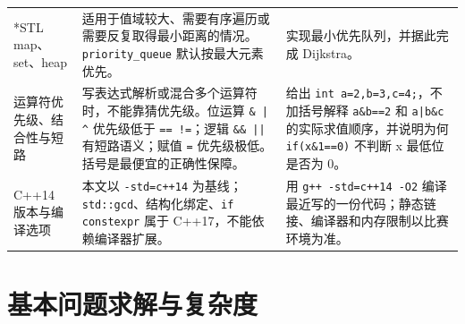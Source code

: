 \documentclass[a4paper,11pt]{article}
\newcommand{\code}[1]{\texttt{#1}}
\begin{document}
\begin{longtable}{L{2.4cm} L{7.5cm} L{6.8cm}}
*STL map、set、heap
& 适用于值域较大、需要有序遍历或需要反复取得最小距离的情况。\code{priority\_queue} 默认按最大元素优先。
& 实现最小优先队列，并据此完成 Dijkstra。 \\[2mm]

运算符优先级、结合性与短路
& 写表达式解析或混合多个运算符时，不能靠猜优先级。位运算 \code{\& | \^{}} 优先级低于 \code{== !=}；逻辑 \code{\&\& ||} 有短路语义；赋值 \code{=} 优先级极低。括号是最便宜的正确性保障。
& 给出 \code{int a=2,b=3,c=4;}，不加括号解释 \code{a\&b==2} 和 \code{a|b\&c} 的实际求值顺序，并说明为何 \code{if(x\&1==0)} 不判断 x 最低位是否为 $0$。 \\[2mm]

C++14 版本与编译选项
& 本文以 \code{-std=c++14} 为基线；\code{std::gcd}、结构化绑定、\code{if constexpr} 属于 C++17，不能依赖编译器扩展。
& 用 \code{g++ -std=c++14 -O2} 编译最近写的一份代码；静态链接、编译器和内存限制以比赛环境为准。 \\
\end{longtable}

\newpage
\section{基本问题求解与复杂度}
\end{document}
